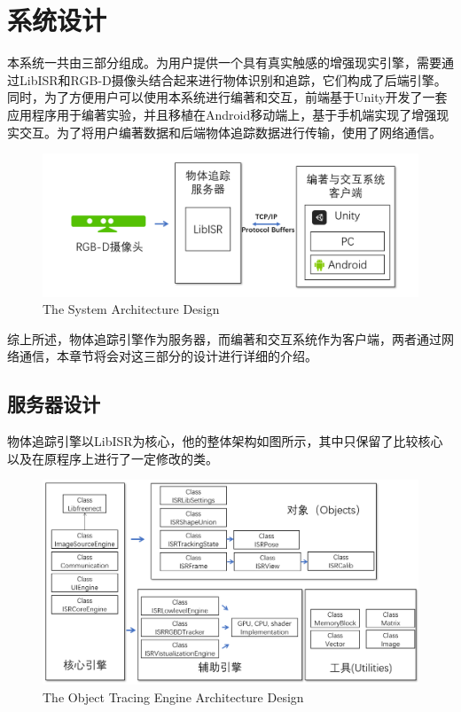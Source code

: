 \chapter{系统设计}
\label{design}

本系统一共由三部分组成。为用户提供一个具有真实触感的增强现实引擎，需要通过LibISR和RGB-D摄像头结合起来进行物体识别和追踪，它们构成了后端引擎。同时，为了方便用户可以使用本系统进行编著和交互，前端基于Unity开发了一套应用程序用于编著实验，并且移植在Android移动端上，基于手机端实现了增强现实交互。为了将用户编著数据和后端物体追踪数据进行传输，使用了网络通信。

\begin{figure}[!htp]
  \centering
  \includegraphics[width=12cm]{figure/TotalArc.png}
    {The System Architecture Design}
 \label{fig:totalarc}
\end{figure}

综上所述，物体追踪引擎作为服务器，而编著和交互系统作为客户端，两者通过网络通信，本章节将会对这三部分的设计进行详细的介绍。

\section{服务器设计}

物体追踪引擎以LibISR为核心\cite{Ren_3DV_2014, star3d_iccv_2013}，他的整体架构如图所示，其中只保留了比较核心以及在原程序上进行了一定修改的类。

\begin{figure}[!htp]
  \centering
  \includegraphics[width=12cm]{figure/LibArc.png}
    {The Object Tracing Engine Architecture Design}
 \label{fig:labarc}
\end{figure}

